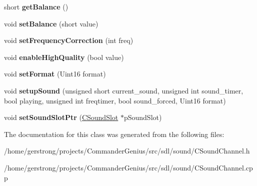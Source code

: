 \begin{DoxyCompactItemize}
\item 
\hypertarget{class_c_sound_channel_a0623e18c1a95c4ebe52d4b7fb92ccb9a}{
short {\bfseries getBalance} ()}
\label{class_c_sound_channel_a0623e18c1a95c4ebe52d4b7fb92ccb9a}

\item 
\hypertarget{class_c_sound_channel_a50835fec0711df91d1b1d4a63a2040cf}{
void {\bfseries setBalance} (short value)}
\label{class_c_sound_channel_a50835fec0711df91d1b1d4a63a2040cf}

\item 
\hypertarget{class_c_sound_channel_a280ddb49b924028aec8b5d0be4231aba}{
void {\bfseries setFrequencyCorrection} (int freq)}
\label{class_c_sound_channel_a280ddb49b924028aec8b5d0be4231aba}

\item 
\hypertarget{class_c_sound_channel_a0fff0a0ecbbc76a75fceb3862eb9fd13}{
void {\bfseries enableHighQuality} (bool value)}
\label{class_c_sound_channel_a0fff0a0ecbbc76a75fceb3862eb9fd13}

\item 
\hypertarget{class_c_sound_channel_a6e2953aeae049f55dde5ffdc761c6f3b}{
void {\bfseries setFormat} (Uint16 format)}
\label{class_c_sound_channel_a6e2953aeae049f55dde5ffdc761c6f3b}

\item 
\hypertarget{class_c_sound_channel_a59286b1cb6cb14fa5d4ac45999b3e970}{
void {\bfseries setupSound} (unsigned short current\_\-sound, unsigned int sound\_\-timer, bool playing, unsigned int freqtimer, bool sound\_\-forced, Uint16 format)}
\label{class_c_sound_channel_a59286b1cb6cb14fa5d4ac45999b3e970}

\item 
\hypertarget{class_c_sound_channel_a99f755e5d9c8dbbfa8fb86d140193745}{
void {\bfseries setSoundSlotPtr} (\hyperlink{class_c_sound_slot}{CSoundSlot} $\ast$pSoundSlot)}
\label{class_c_sound_channel_a99f755e5d9c8dbbfa8fb86d140193745}

\end{DoxyCompactItemize}


The documentation for this class was generated from the following files:\begin{DoxyCompactItemize}
\item 
/home/gerstrong/projects/CommanderGenius/src/sdl/sound/CSoundChannel.h\item 
/home/gerstrong/projects/CommanderGenius/src/sdl/sound/CSoundChannel.cpp\end{DoxyCompactItemize}
